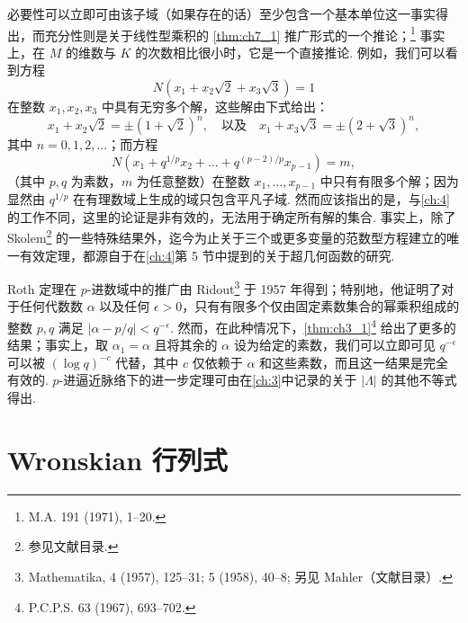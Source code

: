 必要性可以立即可由该子域（如果存在的话）至少包含一个基本单位这一事实得出，而充分性则是关于线性型乘积的 \autoref{thm:ch7_1} 推广形式的一个推论；\footnote{M.A. 191 (1971), 1--20.} 事实上，在 $M$ 的维数与 $K$ 的次数相比很小时，它是一个直接推论. 例如，我们可以看到方程
\[N(x_1 + x_2\sqrt{2} + x_3\sqrt{3}) = 1\]
在整数 $x_1, x_2, x_3$ 中具有无穷多个解，这些解由下式给出：
\[x_1 + x_2\sqrt{2} = \pm (1 + \sqrt{2})^n, \quad \text{以及} \quad x_1 + x_3\sqrt{3} = \pm (2 + \sqrt{3})^n,\]
其中 $n = 0, 1, 2, ...$；而方程
\[N(x_1+q^{1/p}x_2+\ldots+q^{(p-2)/p}x_{p-1})=m,\]
（其中 $p, q$ 为素数，$m$ 为任意整数）在整数 $x_1, ..., x_{p-1}$ 中只有有限多个解；因为显然由 $q^{1/p}$ 在有理数域上生成的域只包含平凡子域. 然而应该指出的是，与\autoref{ch:4}的工作不同，这里的论证是非有效的，无法用于确定所有解的集合. 事实上，除了 Skolem\footnote{参见文献目录.} 的一些特殊结果外，迄今为止关于三个或更多变量的范数型方程建立的唯一有效定理，都源自于在\autoref{ch:4}第 5 节中提到的关于超几何函数的研究.

Roth 定理在 $p$-进数域中的推广由 Ridout\footnote{Mathematika, 4 (1957), 125--31; 5 (1958), 40--8; 另见 Mahler（文献目录）.} 于 1957 年得到；特别地，他证明了对于任何代数数 $\alpha$ 以及任何 $\epsilon > 0$，只有有限多个仅由固定素数集合的幂乘积组成的整数 $p, q$ 满足 $|\alpha - p/q| < q^{-\epsilon}$. 然而，在此种情况下，\autoref{thm:ch3_1}\footnote{P.C.P.S. 63 (1967), 693--702.} 给出了更多的结果；事实上，取 $\alpha_1 = \alpha$ 且将其余的 $\alpha$ 设为给定的素数，我们可以立即可见 $q^{-\epsilon}$ 可以被 $(\log q)^{-c}$ 代替，其中 $c$ 仅依赖于 $\alpha$ 和这些素数，而且这一结果是完全有效的. $p$-进逼近脉络下的进一步定理可由在\autoref{ch:3}中记录的关于 $|\Lambda|$ 的其他不等式得出.

\section{Wronskian 行列式}\label{sec:ch7_2}

